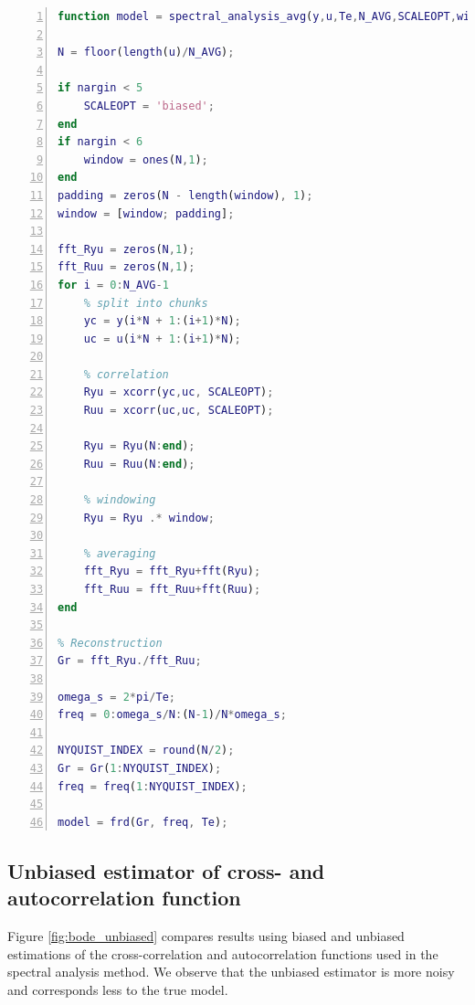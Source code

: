 \documentclass[a4paper,11pt]{article}
\begin{document}
\begin{lstlisting}[language=Matlab,numbers=left,caption=spectral analysis avg,label=lst:spectral_analysis_avg]
function model = spectral_analysis_avg(y,u,Te,N_AVG,SCALEOPT,window)

N = floor(length(u)/N_AVG);

if nargin < 5
    SCALEOPT = 'biased';
end
if nargin < 6
    window = ones(N,1);
end
padding = zeros(N - length(window), 1);
window = [window; padding];

fft_Ryu = zeros(N,1);
fft_Ruu = zeros(N,1);
for i = 0:N_AVG-1
    % split into chunks
    yc = y(i*N + 1:(i+1)*N);
    uc = u(i*N + 1:(i+1)*N);

    % correlation
    Ryu = xcorr(yc,uc, SCALEOPT);
    Ruu = xcorr(uc,uc, SCALEOPT);

    Ryu = Ryu(N:end);
    Ruu = Ruu(N:end);

    % windowing
    Ryu = Ryu .* window;

    % averaging
    fft_Ryu = fft_Ryu+fft(Ryu);
    fft_Ruu = fft_Ruu+fft(Ruu);
end

% Reconstruction
Gr = fft_Ryu./fft_Ruu;

omega_s = 2*pi/Te;
freq = 0:omega_s/N:(N-1)/N*omega_s;

NYQUIST_INDEX = round(N/2);
Gr = Gr(1:NYQUIST_INDEX);
freq = freq(1:NYQUIST_INDEX);

model = frd(Gr, freq, Te);
\end{lstlisting}

\subsection*{Unbiased estimator of cross- and autocorrelation function}

Figure \ref{fig:bode_unbiased} compares results using biased and unbiased estimations of the cross-correlation and autocorrelation functions used in the spectral analysis method. We observe that the unbiased estimator is more noisy and corresponds less to the true model.
\end{document}
